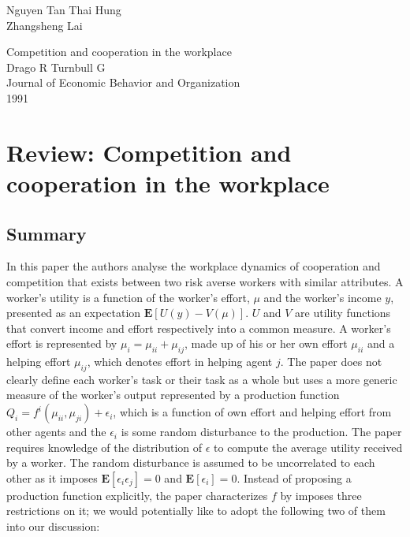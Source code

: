 \documentclass[a4paper,10pt]{article}
\theoremstyle{definition}
\begin{document}
\begin{flushright}
Nguyen Tan Thai Hung\\
Zhangsheng Lai\\
\end{flushright}
\begin{flushleft}
Competition and cooperation in the workplace\\
Drago R Turnbull G\\
Journal of Economic Behavior and Organization\\
1991
\end{flushleft}

\section*{Review: Competition and cooperation in the
workplace}
\subsection*{Summary}

In this paper the authors analyse the workplace dynamics of cooperation and competition that exists between two risk averse workers with similar attributes. A worker's utility is a function of the worker's effort, $\mu$ and the worker's income $y$, presented as an expectation $\mathbf{E}[U(y)-V(\mu)]$.
$U$ and $V$ are utility functions that convert income and effort respectively into a common measure. A worker's effort is represented by $\mu_i = \mu_{ii}+\mu_{ij}$, made up of his or her own effort $\mu_{ii}$ and a helping effort $\mu_{ij}$, which denotes effort in helping agent $j$. The paper does not clearly define each worker's task or their task as a whole but uses a more generic measure of the worker's output represented by a production function $Q_i=f^i(\mu_{ii},\mu_{ji})+\epsilon_i$,
which is a function of own effort and helping effort from other agents and the $\epsilon_i$ is some random disturbance to the production. The paper requires knowledge of the distribution of $\epsilon$ to compute the average utility received by a worker. The random disturbance is assumed to be uncorrelated to each other as it imposes $\mathbf{E}[\epsilon_i\epsilon_j]=0$ and $\mathbf{E}[\epsilon_i]=0$. Instead of proposing a production function explicitly, the paper characterizes $f$ by imposes three restrictions on it; we would potentially like to adopt the following two of them into our discussion: 
\end{document}
